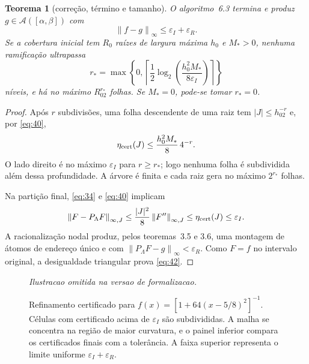 \documentclass[11pt,a4paper]{article}
\theoremstyle{preciso}
\newtheorem{teorema}{Teorema}[section]
\theoremstyle{definition}
\newcommand{\Asm}{\mathcal A}
\newcommand{\norm}[1]{\left\|#1\right\|_{\infty}}
\newcommand{\normK}[2]{\left\|#1\right\|_{\infty,#2}}
\newcommand{\eqn}[2]{\begin{equation}\label{eq:#1}#2\end{equation}}
\begin{document}
\begin{teorema}[correção, término e tamanho]
O algoritmo~6.3 termina e produz $g\in\Asm([\alpha,\beta])$ com
\eqn{42}{\norm{f-g}\le\varepsilon_I+\varepsilon_R.}
Se a cobertura inicial tem $R_0$ raízes de largura máxima $h_0$ e $M_*>0$, nenhuma ramificação ultrapassa
\eqn{43}{r_*=\max\left\{0,\left\lceil\frac12\log_2\left(\frac{h_0^2M_*}{8\varepsilon_I}\right)\right\rceil\right\}}
níveis, e há no máximo $R_02^{r_*}$ folhas. Se $M_*=0$, pode-se tomar $r_*=0$.
\end{teorema}
\begin{proof}
Após $r$ subdivisões, uma folha descendente de uma raiz tem $|J|\le h_02^{-r}$ e, por \eqref{eq:40},
\[
\eta_{\rm cert}(J)\le\frac{h_0^2M_*}8\,4^{-r}.
\]
O lado direito é no máximo $\varepsilon_I$ para $r\ge r_*$; logo nenhuma folha é subdividida além dessa profundidade. A árvore é finita e cada raiz gera no máximo $2^{r_*}$ folhas.

Na partição final, \eqref{eq:34} e \eqref{eq:40} implicam
\[
\normK{F-P_\Lambda F}{J}\le\frac{|J|^2}8\normK{F''}{J}\le\eta_{\rm cert}(J)\le\varepsilon_I.
\]
A racionalização nodal produz, pelos teoremas~3.5 e 3.6, uma montagem de átomos de endereço único e com $\norm{P_\Lambda F-g}<\varepsilon_R$. Como $F=f$ no intervalo original, a desigualdade triangular prova \eqref{eq:42}.
\end{proof}
\begin{figure}[H]\centering
\emph{Ilustracao omitida na versao de formalizacao.}
\caption{Refinamento certificado para $f(x)=[1+64(x-5/8)^2]^{-1}$. Células com certificado acima de $\varepsilon_I$ são subdivididas. A malha se concentra na região de maior curvatura, e o painel inferior compara os certificados finais com a tolerância. A faixa superior representa o limite uniforme $\varepsilon_I+\varepsilon_R$.}
\label{fig:refinamento}
\end{figure}
\end{document}
